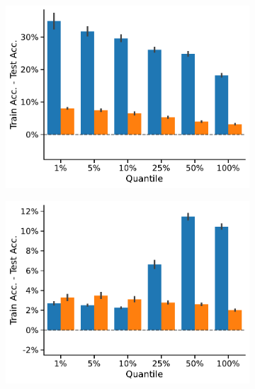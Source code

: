 \begin{figure}[htb]
	\begin{subfigure}[b]{0.3\textwidth}
		\centering
		\includegraphics[width=\textwidth]{Figures/train_test_diff_ENZYMES.pdf}
		\vspace*{-4ex} 
		\caption{\enzymes}
	\end{subfigure}
	\hfill
	\begin{subfigure}[b]{0.3\textwidth}
		\centering
		\includegraphics[width=\textwidth]{Figures/train_test_diff_IMDB-BINARY.pdf}
		\vspace*{-4ex} 
		\caption{\imdb}
	\end{subfigure}
	\hfill
	\begin{subfigure}[b]{0.3\textwidth}

\end{subfigure}
\end{figure}
